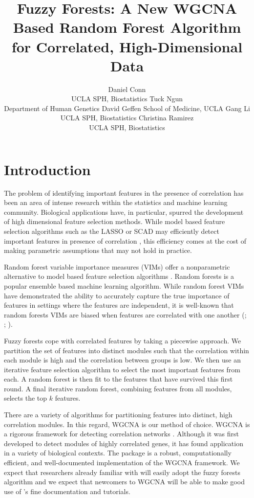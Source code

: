 \documentclass[article,shortnames]{jss}
\author{Daniel Conn\\ UCLA SPH, Biostatistics \AND Tuck Ngun\\Department of Human Genetics David Geffen School of Medicine, UCLA \AND  Gang Li\\UCLA SPH, Biostatistics \And Christina Ramirez\\UCLA SPH, Biostatistics}
\title{Fuzzy Forests: A New WGCNA Based Random Forest Algorithm for Correlated, High-Dimensional Data}
\begin{document}

\section{Introduction}
The problem of identifying important features in the presence of correlation has been an area of intense research within the statistics
and machine learning community.  Biological applications have, in particular, spurred the development of high dimensional feature selection methods.   
While model based feature selection algorithms such as the LASSO or SCAD may efficiently detect important features in presence of correlation \citep{raskutti2010restricted}, this efficiency comes at the cost of making parametric assumptions that may not hold in practice. 
 
Random forest variable importance measures (VIMs) offer a nonparametric alternative to model based feature selection algorithms \citep{breiman2001random}.
Random forests is a popular ensemble based machine learning algorithm.  While random forest VIMs have demonstrated the ability to accurately capture the true 
importance of features in settings where the features are independent, it is well-known that random forests VIMs are biased when features are correlated
with one another (\citep{strobl2007bias}; \citep{strobl2008conditional}; \citep{nicodemus2009predictor}).

Fuzzy forests cope with correlated features by taking a piecewise approach.  We partition the set of features into distinct modules such that the correlation within each module is high and the correlation between groups is low.  We then use an iterative feature selection algorithm to select the most important
features from each.  A random forest is then fit to the features that have survived this first round.  A final iterative random forest,  combining features from all
modules, selects the top $k$ features. 

There are a variety of algorithms for partitioning features into distinct, high correlation modules.  In this regard, WGCNA is our method of choice.  WGCNA is a rigorous framework for detecting correlation networks \citep{zhang2005general}.  Although it was first developed to detect modules of highly correlated genes, it has found application in a variety of biological contexts.  The  package  is a robust, computationally efficient, and well-documented implementation of the WGCNA framework.  We expect that researchers already familiar with  will easily adopt the fuzzy forests algorithm and we expect that newcomers to WGCNA will be able to make good use of 's fine documentation and tutorials.
              
\end{document}

